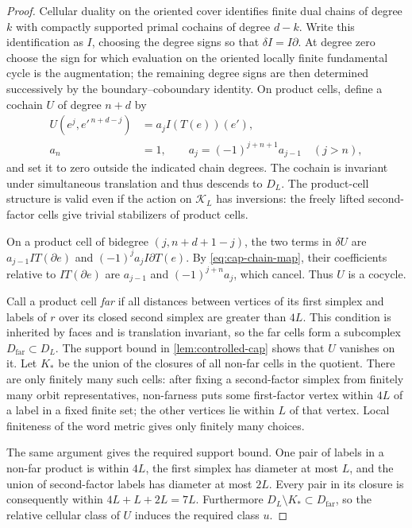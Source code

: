 \begin{proof}
Cellular duality on the oriented cover identifies finite dual chains
of degree $k$ with compactly supported primal cochains of degree
$d-k$.  Write this identification as $I$, choosing the degree signs
so that $\delta I=I\partial$.  At degree zero choose the sign for which
evaluation on the oriented locally finite fundamental cycle is the
augmentation; the remaining degree signs are then determined
successively by the boundary--coboundary identity.  On product cells,
define a cochain $U$ of degree $n+d$ by
\begin{equation}
\label{eq:product-cocycle}
 \begin{split}
 U(e^j,e'^{\,n+d-j})&=a_j I(T(e))(e'),\\
 a_n&=1,\qquad
 a_j=(-1)^{j+n+1}a_{j-1}\quad(j>n),
 \end{split}
\end{equation}
and set it to zero outside the indicated chain degrees.  The cochain
is invariant under simultaneous translation and thus descends to
$D_L$.  The product-cell structure is valid even if the action on
$\mathcal K_L$ has inversions: the freely lifted second-factor cells
give trivial stabilizers of product cells.

On a product cell of bidegree $(j,n+d+1-j)$, the two terms in
$\delta U$ are $a_{j-1}IT(\partial e)$ and
$(-1)^ja_jI\partial T(e)$.  By \cref{eq:cap-chain-map}, their
coefficients relative to $IT(\partial e)$ are
$a_{j-1}$ and $(-1)^{j+n}a_j$, which cancel.  Thus $U$ is a cocycle.

Call a product cell \emph{far} if all distances between vertices of
its first simplex and labels of $r$ over its closed second simplex
are greater than $4L$.  This condition is inherited by faces and is
translation invariant, so the far cells form a subcomplex
$D_{\mathrm{far}}\subset D_L$. The support bound in
\cref{lem:controlled-cap} shows that
$U$ vanishes on it.  Let $K_*$ be the union of the closures of all
non-far cells in the quotient.  There are only finitely many such
cells: after fixing a second-factor simplex from finitely many orbit
representatives, non-farness puts some first-factor vertex within
$4L$ of a label in a fixed finite set; the other vertices lie within
$L$ of that vertex.  Local finiteness of the word metric gives only
finitely many choices.

The same argument gives the required support bound.  One pair of
labels in a non-far product is within $4L$, the first simplex has
diameter at most $L$, and the union of second-factor labels has
diameter at most $2L$.  Every pair in its closure is consequently
within $4L+L+2L=7L$.  Furthermore
$D_L\setminus K_*\subset D_{\mathrm{far}}$, so the relative cellular
class of $U$ induces the required class $u$.


\end{proof}
